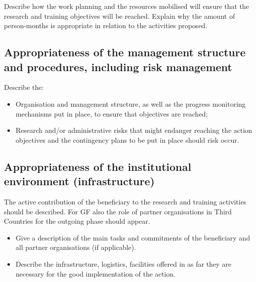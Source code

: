 \documentclass[a4paper,11pt]{article}
\newcommand{\acronym}{{\sc YourAcronym}\xspace}
\begin{document}
Describe how the work planning and the resources mobilised will ensure that the research and training objectives will be reached. 
Explain why the amount of person-months is appropriate in relation to the activities proposed.

\subsection{Appropriateness of the management structure and procedures, including risk management}

Describe the:

\begin{itemize}
\item Organisation and management structure, as well as the progress monitoring mechanisms put in place, to ensure that objectives are reached;
\item Research and/or administrative risks that might endanger reaching the action objectives and the contingency plans to be put in place should risk occur.
\end{itemize}


\subsection{Appropriateness of the institutional environment (infrastructure)}
\label{sec:institution}

The active contribution of the beneficiary to the research and training activities should be described. For GF also the role of partner organisations in Third Countries for the outgoing phase should appear.          
\begin{itemize}
\item Give a description of the main tasks and commitments of the beneficiary and all partner organisations (if applicable).
\item Describe the infrastructure, logistics, facilities offered in as far they are necessary for the good implementation of the action. 
\end{itemize}

%
%
%      
%     
%  
%          
%
%
%
%
%
\end{document}
